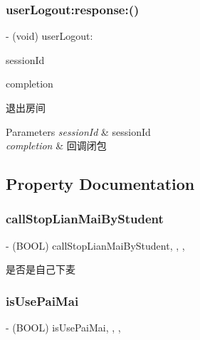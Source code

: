 \subsubsection{\texorpdfstring{user\+Logout\+:response\+:()}{userLogout:response:()}}
{\footnotesize\ttfamily -\/ (void) user\+Logout\+: \begin{DoxyParamCaption}\item[{(N\+S\+String $\ast$)}]{session\+Id }\item[{response:(C\+C\+Comletion\+Block)}]{completion }\end{DoxyParamCaption}}

退出房间 
\begin{DoxyParams}{Parameters}
{\em session\+Id} & session\+Id \\
\hline
{\em completion} & 回调闭包 \\
\hline
\end{DoxyParams}


\subsection{Property Documentation}
\mbox{\label{interface_c_c_streamer_basic_aa682504571afd589ebd01253fa47f016}} 
\subsubsection{\texorpdfstring{call\+Stop\+Lian\+Mai\+By\+Student}{callStopLianMaiByStudent}}
{\footnotesize\ttfamily -\/ (B\+O\+OL) call\+Stop\+Lian\+Mai\+By\+Student\hspace{0.3cm}{\ttfamily [read]}, {\ttfamily [write]}, {\ttfamily [nonatomic]}, {\ttfamily [assign]}}

是否是自己下麦 \mbox{\label{interface_c_c_streamer_basic_ac8814cbe4938b42bf489b7ebc8ffd77a}} 
\subsubsection{\texorpdfstring{is\+Use\+Pai\+Mai}{isUsePaiMai}}
{\footnotesize\ttfamily -\/ (B\+O\+OL) is\+Use\+Pai\+Mai\hspace{0.3cm}{\ttfamily [read]}, {\ttfamily [write]}, {\ttfamily [nonatomic]}, {\ttfamily [assign]}}

